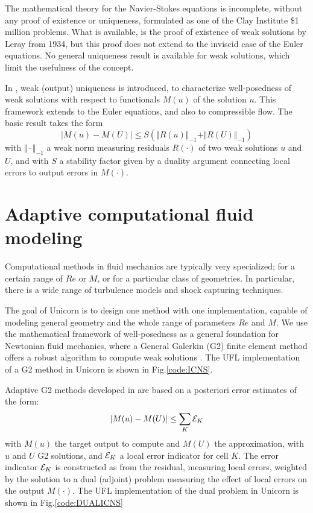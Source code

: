 The mathematical theory for the Navier-Stokes equations is incomplete,
without any proof of existence or uniqueness, formulated as one of the
Clay Institute \$1 million problems.  What is available, is the proof
of existence of weak solutions by Leray from 1934, but this proof does
not extend to the inviscid case of the Euler equations.  No general
uniqueness result is available for weak solutions, which limit the
usefulness of the concept.

In \cite{HoffmanJohnson2008a}, weak (output) uniqueness is introduced,
to characterize well-posedness of weak solutions with respect to
functionals $M(u)$ of the solution $u$. This framework extends to the
Euler equations, and also to compressible flow. The basic result takes
the form
\begin{equation}
\vert M(u) - M(U) \vert \leq S (\Vert R(u)\Vert_{-1} + \Vert R(U)\Vert_{-1})
\end{equation}
with $\Vert \cdot \Vert _{-1}$ a weak norm measuring residuals $R(\cdot)$ of two weak solutions $u$ and
$U$, and with $S$ a stability factor given by a duality argument connecting local errors to output errors
in $M(\cdot)$.

\section{Adaptive computational fluid modeling}

Computational methods in fluid mechanics are typically very
specialized; for a certain range of $Re$ or $M$, or for a particular
class of geometries. In particular, there is a wide range of
turbulence models and shock capturing techniques.

The goal of Unicorn is to design one method with one implementation,
capable of modeling general geometry and the whole range of parameters
$Re$ and $M$. We use the mathematical framework of well-posedness as a
general foundation for Newtonian fluid mechanics, where a General
Galerkin (G2) finite element method offers a robust algorithm to
compute weak solutions \cite{HoffmanJohnson2006}.  The UFL
implementation of a G2 method in Unicorn is shown in
Fig.\ref{code:ICNS}.

Adaptive G2 methods developed
in \cite{HoffmanJohnson2006b,Hoffman2005,Hoffman2009,Hoffman2006} are
based on a posteriori error estimates of the form:
\begin{equation}
\vert M(u) - M(U) \vert \leq \sum_K {\cal E}_K
\end{equation}
with $M(u)$ the target output to compute and $M(U)$ the approximation,
with $u$ and $U$ G2 solutions, and ${\cal E}_K$ a local error
indicator for cell $K$.  The error indicator ${\cal E}_K$ is
constructed as from the residual, measuring local errors, weighted by
the solution to a dual (adjoint) problem measuring the effect of local
errors on the output $M(\cdot)$. The UFL implementation of the dual
problem in Unicorn is shown in Fig.\ref{code:DUALICNS}

